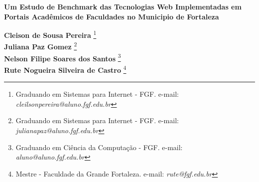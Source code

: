 \documentclass[12pt]{article}
\begin{document}

%



\begin{center}
\textbf{\Large{Um Estudo de Benchmark das Tecnologias Web Implementadas em Portais Acadêmicos de Faculdades no Municipio de Fortaleza}}\\
\end{center}
 
\vspace*{0.2cm}

\begin{flushright}
 {\bf Cleison de Sousa Pereira} \footnote[1]{Graduando em Sistemas para Internet - FGF. e-mail: \it cleilsonpereira@aluno.fgf.edu.br}  \\
 {\bf Juliana Paz Gomez} \footnote[2]{Graduando em Sistemas para Internet - FGF. e-mail: \it julianapaz@aluno.fgf.edu.br}  \\
  {\bf Nelson Filipe Soares dos Santos} \footnote[3]{Graduando em Ciência da Computação - FGF. e-mail: \it aluno@aluno.fgf.edu.br}  \\
   {\bf Rute Nogueira Silveira de Castro} \footnote[4]{Mestre - Faculdade da Grande Fortaleza. e-mail: \it rute@fgf.edu.br}   \\
\end{flushright}

\vspace*{0.5cm}

\end{document}
